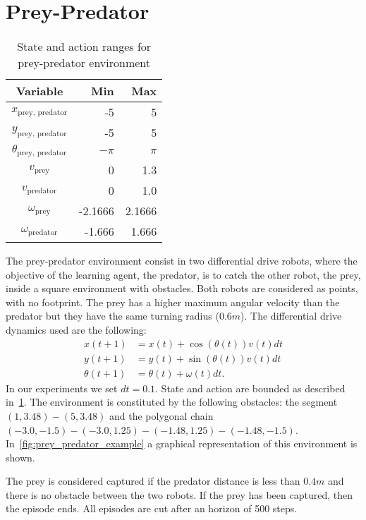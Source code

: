 \section{Prey-Predator}
\label{a:prey_predator_description}
\begin{table}[b]
	\centering
	\begin{tabular}{c r r}
		\toprule
		Variable & Min & Max \\
		\midrule
		$x_{\text{prey, predator}}$ & -5 & 5 \\ 
		$y_{\text{prey, predator}}$ & -5 & 5 \\
		$\theta_{\text{prey, predator}}$ & $-\pi$ & $\pi$ \\
		$v_{\text{prey}}$ & 0 & 1.3 \\
		$v_{\text{predator}}$ & 0 & 1.0 \\
		$\omega_{\text{prey}}$ & -2.1666 & 2.1666 \\
		$\omega_{\text{predator}}$ & -1.666 & 1.666 \\
		\bottomrule
	\end{tabular}
	\caption{State and action ranges for prey-predator environment}
	\label{tab:segway_ranges}
\end{table}
The prey-predator environment consist in two differential drive robots, where the objective of the learning agent, the predator, is to catch the other robot, the prey, inside a square environment with obstacles. Both robots are considered as points, with no footprint.
The prey has a higher maximum angular velocity than the predator but they have the same turning radius ($0.6m$).
The differential drive dynamics used are the following:
\begin{align*}
 x(t+1) & = x(t)+\cos(\theta(t))v(t)dt \\
 y(t+1) & = y(t)+\sin(\theta(t))v(t)dt \\
 \theta(t+1) & = \theta(t)+\omega(t) dt.
\end{align*}
In our experiments we set $dt=0.1$.
State and action are bounded as described in~\cref{tab:segway_ranges}.
The environment is constituted by the following obstacles: the segment $(1, 3.48)-(5, 3.48)$ and the polygonal chain $(-3.0, -1.5)-(-3.0, 1.25)-(-1.48 ,1.25)-(-1.48, -1.5)$. In~\cref{fig:prey_predator_example} a graphical representation of this environment is shown.

The prey is considered captured if the predator distance is less than $0.4m$ and there is no obstacle between the two robots. If the prey has been captured, then the episode ends. All episodes are cut after an horizon of 500 steps.

